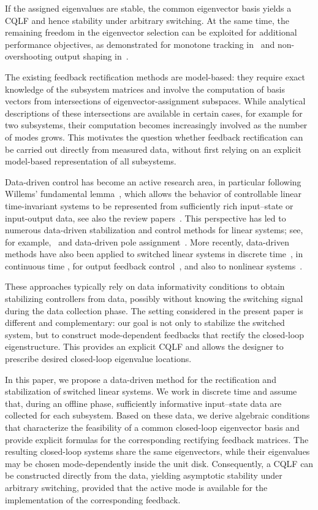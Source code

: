 \documentclass[11pt]{article}
\theoremstyle{plain}
\theoremstyle{definition}
\theoremstyle{remark}
\begin{document}
If the assigned eigenvalues are stable, the common eigenvector basis yields a
CQLF and hence stability under arbitrary switching. At the same time, the
remaining freedom in the eigenvector selection can be exploited for additional
performance objectives, as demonstrated for monotone tracking
in~\cite{HoneckerSWR24} and non-overshooting output shaping
in~\cite{WulffHSR26}.

The existing feedback rectification methods are model-based: they require exact knowledge of the subsystem matrices and involve the computation of basis vectors from intersections of eigenvector-assignment subspaces. While analytical descriptions of these intersections are available in certain cases, for example for two subsystems, their computation becomes increasingly involved as the number of modes grows. This motivates the question whether feedback rectification can be carried out directly from measured data, without first relying on an explicit model-based representation of all subsystems.

Data-driven control has become an active research area, in particular following Willems' fundamental lemma~\cite{Willems2005}, which allows the behavior of controllable linear time-invariant systems to be represented from sufficiently rich input--state or input-output data, see also the review papers~\cite{markovsky2021behavioral,Faulwasser23}.
This perspective has led to numerous data-driven stabilization and control methods for linear systems; see, for example,~\cite{van2020willems} and data-driven pole assignment~\cite{celi23}. More recently, data-driven methods have also been applied to switched linear systems in discrete time~\cite{eising2024data}, in continuous time \cite{bianchi2025data}, for output feedback control~\cite{hu2023data}, and also to nonlinear systems~\cite{Ju2026}.

These approaches typically rely on data informativity conditions to obtain stabilizing controllers from data, possibly without knowing the switching signal during the data collection phase. The setting considered in the present paper is different and complementary: our goal is not only to stabilize the switched system, but to construct mode-dependent feedbacks that rectify the closed-loop eigenstructure. This provides an explicit CQLF and allows the designer to prescribe desired closed-loop eigenvalue locations.

In this paper, we propose a data-driven method for the rectification and stabilization of switched linear systems. We work in discrete time and assume that, during an offline phase, sufficiently informative input--state data are collected for each subsystem. Based on these data, we derive algebraic conditions that characterize the feasibility of a common closed-loop eigenvector basis and provide explicit formulas for the corresponding rectifying feedback matrices. The resulting closed-loop systems share the same eigenvectors, while their eigenvalues may be chosen mode-dependently inside the unit disk. Consequently, a CQLF can be constructed directly from the data, yielding asymptotic stability under arbitrary switching, provided that the active mode is available for the implementation of the corresponding feedback.
\end{document}
